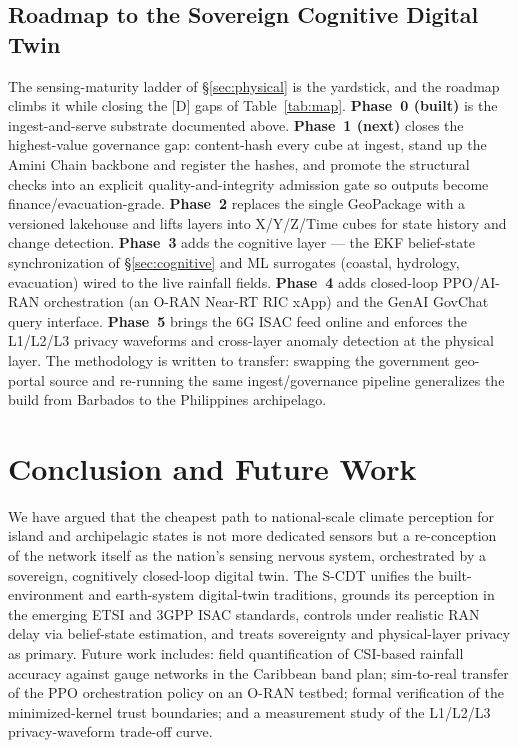 \documentclass[10pt,twocolumn]{article}
\begin{document}
\subsection{Roadmap to the Sovereign Cognitive Digital Twin}
\label{sec:roadmap}
The sensing-maturity ladder of \S\ref{sec:physical} is the yardstick, and the roadmap
climbs it while closing the [D] gaps of Table~\ref{tab:map}. \textbf{Phase~0 (built)}
is the ingest-and-serve substrate documented above. \textbf{Phase~1 (next)} closes the
highest-value governance gap: content-hash every cube at ingest, stand up the Amini
Chain backbone and register the hashes, and promote the structural checks into an
explicit quality-and-integrity admission gate so outputs become
finance/evacuation-grade. \textbf{Phase~2} replaces the single GeoPackage with a
versioned lakehouse and lifts layers into X/Y/Z/Time cubes for state history and
change detection. \textbf{Phase~3} adds the cognitive layer --- the EKF belief-state
synchronization of \S\ref{sec:cognitive} and ML surrogates (coastal, hydrology,
evacuation) wired to the live rainfall fields. \textbf{Phase~4} adds closed-loop
PPO/AI-RAN orchestration (an O-RAN Near-RT RIC xApp) and the GenAI GovChat query
interface. \textbf{Phase~5} brings the 6G ISAC feed online and enforces the L1/L2/L3
privacy waveforms and cross-layer anomaly detection at the physical layer. The
methodology is written to transfer: swapping the government geo-portal source and
re-running the same ingest/governance pipeline generalizes the build from Barbados to
the Philippines archipelago.

\section{Conclusion and Future Work}
We have argued that the cheapest path to national-scale climate perception for
island and archipelagic states is not more dedicated sensors but a
re-conception of the network itself as the nation's sensing nervous system,
orchestrated by a sovereign, cognitively closed-loop digital twin. The S-CDT
unifies the built-environment and earth-system digital-twin traditions,
grounds its perception in the emerging ETSI and 3GPP ISAC standards, controls
under realistic RAN delay via belief-state estimation, and treats sovereignty
and physical-layer privacy as primary. Future work includes: field
quantification of CSI-based rainfall accuracy against gauge networks in the
Caribbean band plan; sim-to-real transfer of the PPO orchestration policy on an
O-RAN testbed; formal verification of the minimized-kernel trust boundaries; and
a measurement study of the L1/L2/L3 privacy-waveform trade-off curve.
\end{document}
